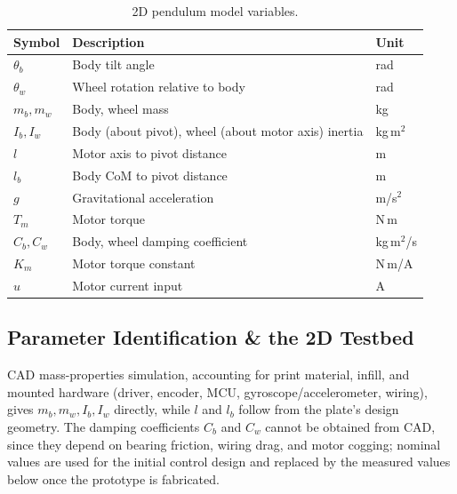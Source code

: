 \begin{table}[htbp]
\centering
\caption[2D pendulum model variables]{2D pendulum model variables.}
\label{tab:2d_vars}
\begin{tabular}{lll}
\toprule
Symbol & Description & Unit \\
\midrule
$\theta_b$ & Body tilt angle & rad \\
$\theta_w$ & Wheel rotation relative to body & rad \\
$m_b, m_w$ & Body, wheel mass & kg \\
$I_b, I_w$ & Body (about pivot), wheel (about motor axis) inertia & kg\,m$^2$ \\
$l$ & Motor axis to pivot distance & m \\
$l_b$ & Body CoM to pivot distance & m \\
$g$ & Gravitational acceleration & m/s$^2$ \\
$T_m$ & Motor torque & N\,m \\
$C_b, C_w$ & Body, wheel damping coefficient & kg\,m$^2$/s \\
$K_m$ & Motor torque constant & N\,m/A \\
$u$ & Motor current input & A \\
\bottomrule
\end{tabular}
\end{table}

\newpage
\subsection{Parameter Identification \& the 2D Testbed}
\label{sec:paramid}

CAD mass-properties simulation, accounting for print material, infill, and
mounted hardware (driver, encoder, MCU, gyroscope/accelerometer, wiring),
gives $m_b, m_w, I_b, I_w$ directly, while $l$ and $l_b$ follow from the
plate's design geometry. The damping coefficients $C_b$ and $C_w$ cannot be
obtained from CAD, since they depend on bearing friction, wiring drag, and
motor cogging; nominal values are used for the initial control design and
replaced by the measured values below once the prototype is fabricated.

